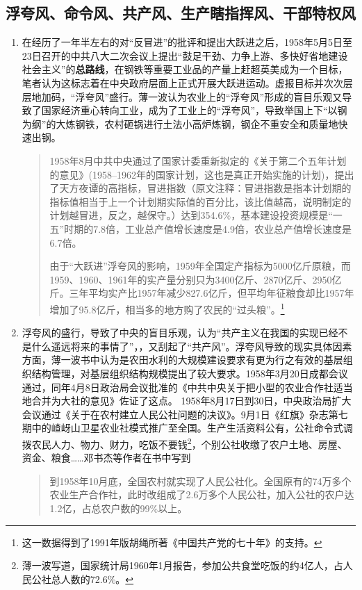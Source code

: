 
\subsection{浮夸风、命令风、共产风、生产瞎指挥风、干部特权风}

\begin{enumerate}
\item 在经历了一年半左右的对“反冒进”的批评和提出大跃进之后，1958年5月5日至23日召开的中共八大二次会议上提出“鼓足干劲、力争上游、多快好省地建设社会主义”的\textbf{总路线}，在钢铁等重要工业品的产量上赶超英美成为一个目标，笔者认为这标志着在中央政府层面上正式开展大跃进运动。虚报目标并次次层层地加码，“浮夸风”盛行。薄一波认为农业上的“浮夸风”形成的盲目乐观又导致了国家经济重心转向工业，成为了工业上的“浮夸风”，导致举国上下“以钢为纲”的大炼钢铁，农村砸锅进行土法小高炉炼钢，钢企不重安全和质量地快速出钢。

  \begin{quotation} 1958年8月中共中央通过了国家计委重新拟定的《关于第二个五年计划的意见》(1958--1962年的国家计划，这也是真正开始实施的计划)，提出了天方夜谭的高指标，冒进指数（原文注释：冒进指数是指本计划期的指标值相当于上一个计划期实际值的百分比，该比值越高，说明制定的计划越冒进，反之，越保守。）达到354.6\%，基本建设投资规模是“一五”时期的7.8倍，工业总产值增长速度是4.9倍，农业总产值增长速度是6.7倍。\cite{shiyiwu}

    由于“大跃进”浮夸风的影响，1959年全国定产指标为5000亿斤原粮，而1959、1960、1961年的实产量分别只为3400亿斤、2870亿斤、2950亿斤。三年平均实产比1957年减少827.6亿斤，但平均年征粮食却比1957年增加了95.8亿斤，相当多的地方购了农民的“过头粮”。\footnote{这一数据得到了1991年版胡绳所著《中国共产党的七十年》的支持。}
  \end{quotation}


\item 浮夸风的盛行，导致了中央的盲目乐观，认为“共产主义在我国的实现已经不是什么遥远将来的事情了”，，又刮起了“共产风”。浮夸风导致的现实具体因素方面，薄一波书中认为是农田水利的大规模建设要求有更为行之有效的基层组织结构管理，对基层组织结构规模提出了较大要求。1958年3月20日成都会议通过，同年4月8日政治局会议批准的《中共中央关于把小型的农业合作社适当地合并为大社的意见》佐证了这点。 1958年8月17日到30日，中央政治局扩大会议通过《关于在农村建立人民公社问题的决议》。9月1日《红旗》杂志第七期中的嵖岈山卫星农业社模式推广至全国。生产生活资料公有，公社命令式调拨农民人力、物力、财力，吃饭不要钱\footnote{薄一波写道，国家统计局1960年1月报告，参加公共食堂吃饭的约4亿人，占人民公社总人数的72.6\%。}，个别公社收缴了农户土地、房屋、资金、粮食……邓书杰等作者在书中写到
  \begin{quotation}到1958年10月底，全国农村就实现了人民公社化。全国原有的74万多个农业生产合作社，此时改组成了2.6万多个人民公社，加入公社的农户达1.2亿，占总农户数的99\%以上。
  \end{quotation}


\end{enumerate}
